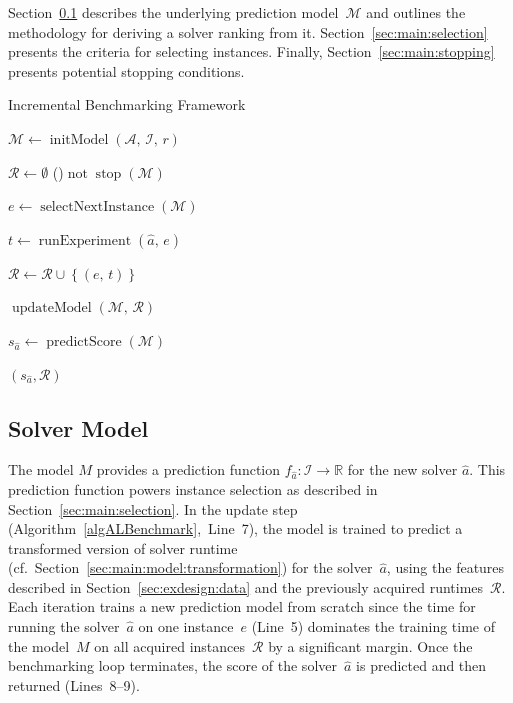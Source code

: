 \documentclass[sn-basic, Numbered]{sn-jnl} %
\begin{document}
Section~\ref{sec:main:model} describes the underlying prediction model~$\mathcal{M}$ and outlines the methodology for deriving a solver ranking from it.
Section~\ref{sec:main:selection} presents the criteria for selecting instances.
Finally, Section~\ref{sec:main:stopping} presents potential stopping conditions.

\begin{algorithm}[t]
  \caption{Incremental Benchmarking Framework}
  \label{algALBenchmark}


  \BlankLine

  $\mathcal{M} \leftarrow \operatorname{initModel}\left(\mathcal{A},\, \mathcal{I},\, r\right)$ 
  
  \BlankLine
  $\mathcal{R} \leftarrow \emptyset$ \;
  \While(){$\operatorname{not} \operatorname{stop}\left(\mathcal{M}\right)$}{
    $e \leftarrow \operatorname{selectNextInstance}\left(\mathcal{M}\right)$ 

    $t \leftarrow \operatorname{runExperiment}\left(\hat{a},\,  e\right)$  

    $\mathcal{R} \leftarrow \mathcal{R} \cup \left\lbrace (e,\, t) \right\rbrace$

    \BlankLine
    $\operatorname{updateModel}\left(\mathcal{M},\, \mathcal{R}\right)$ 
  }
  $s_{\hat a} \leftarrow \operatorname{predictScore}(\mathcal{M})$ 
  
  \BlankLine
  \Return $(s_{\hat a}, \mathcal{R})$
\end{algorithm}


\subsection{Solver Model}
\label{sec:main:model}

The model $M$ provides a prediction function $f_{\hat a} : \mathcal{I} \rightarrow \mathbb{R}$ for the new solver $\hat a$.
This prediction function powers instance selection as described in Section~\ref{sec:main:selection}.
In the update step (Algorithm~\ref{algALBenchmark},~Line~7), the model is trained to predict a transformed version of solver runtime (cf.~Section~\ref{sec:main:model:transformation}) for the solver~$\hat{a}$, using the features described in Section~\ref{sec:exdesign:data} and the previously acquired runtimes~$\mathcal{R}$.
Each iteration trains a new prediction model from scratch since the time for running the solver~$\hat{a}$ on one instance~$e$ (Line~5) dominates the training time of the model~$M$ on all acquired instances~$\mathcal{R}$ by a significant margin.
Once the benchmarking loop terminates, the score of the solver~$\hat{a}$ is predicted and then returned (Lines~8--9).
\end{document}
